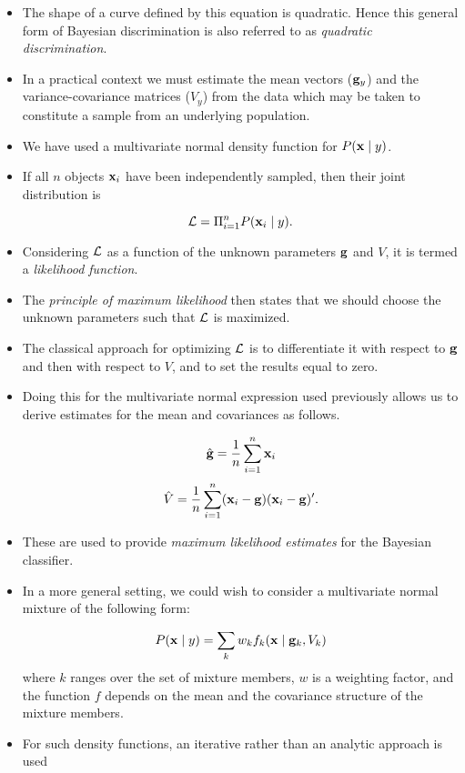 \documentclass[a4,dvips]{seminar}
\newcommand{\heading}[1]{%
  \begin{center}
    \large\bf
    \shadowbox{#1}%
  \end{center}
  \vspace{1ex minus 1ex}}
\begin{document}
\begin{slide}
\begin{itemize}
\item The shape of a curve defined by this equation is quadratic.  Hence
this general form of Bayesian discrimination is also referred to
as {\sl quadratic discrimination}.
\end{itemize}
\end{slide}

\begin{slide}
\textcolor {reddish} {\heading{Maximum Likelihood Discrimination}}
\begin{itemize}
\item In a practical context we must estimate the mean vectors (${\bf g}_y$)
and the variance-covariance matrices ($V_y$) from the data which
may be taken to constitute a sample from an underlying population. 
\item We have used a multivariate normal density function for $P({\bf x} \mid
y)$.  
\item If all $n$ objects ${\bf x}_i$ have been independently sampled,
then their joint distribution is 
 
$$ {\cal L} = \Pi_{i=1}^n P({\bf x}_i \mid y). $$

\item Considering ${\cal L}$ as a function of the unknown parameters ${\bf g}$ 
and $V$, it is termed a {\sl likelihood function}.  
\item The {\sl principle of
maximum likelihood} then states that we should choose the unknown
parameters such that ${\cal L}$ is maximized.  
\item The classical approach
for optimizing ${\cal L}$ is to differentiate it with respect to
${\bf g}$ and then with respect to $V$, and to set the results equal to
zero.  
\item Doing this for the multivariate normal expression used
previously allows us to derive estimates for the mean and covariances
as follows.
 
$$ \hat{\bf g} = {1 \over n} \sum_{i=1}^n {\bf x}_i $$
$$ \hat{V} = {1 \over n} \sum_{i=1}^n ( {\bf x}_i - {\bf g} )
                                   ( {\bf x}_i - {\bf g} )^\prime . $$
\item These are used to provide {\sl maximum likelihood estimates} for the
Bayesian classifier.
\item In a more general setting, we could wish to consider a multivariate
normal mixture of the following form:
 
$$ P({\bf x} \mid y) = \sum_k w_k f_k({\bf x} \mid {\bf g}_k, V_k) 
$$ where
$k$ ranges over the set of mixture members, $w$ is a weighting 
factor, and the function $f$ depends on the mean and the covariance
structure of the mixture members.  
\item For such density functions, an
iterative rather than an analytic approach is used
\end{itemize}
\end{slide}
\end{document}
